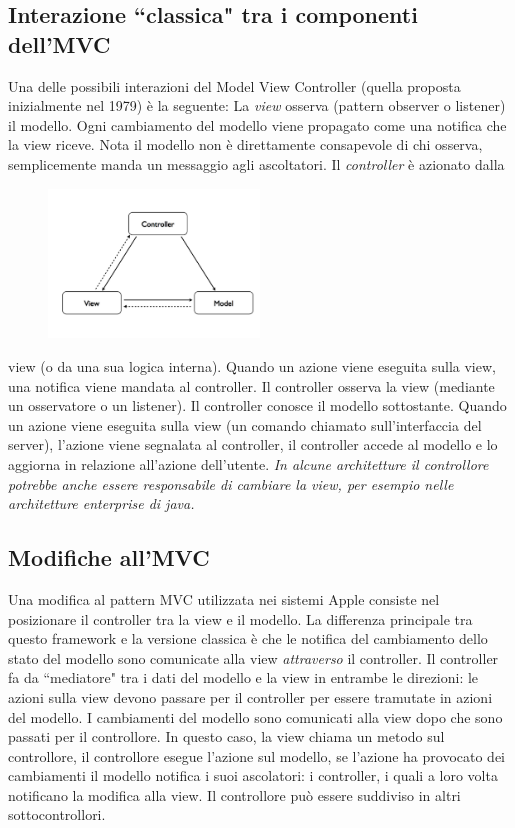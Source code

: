 \documentclass{article}
\begin{document}
\subsection{Interazione ``classica" tra i componenti dell'MVC}
Una delle possibili interazioni del Model View Controller (quella proposta inizialmente nel 1979) \`e la seguente:
 La \emph{view} osserva (pattern observer o listener) il modello. Ogni cambiamento del modello viene propagato come una notifica che la view riceve. Nota il modello non \`e direttamente consapevole di chi osserva, semplicemente manda un messaggio agli ascoltatori.
Il \emph{controller} \`e azionato dalla\begin{figure}[h]
\centering
\includegraphics[width=0.5\textwidth]{Img/MVC2.pdf}
\end{figure} view (o da una sua logica interna). Quando un azione viene eseguita sulla view, una notifica viene mandata al controller. Il controller osserva la view (mediante un osservatore o un listener). Il controller conosce il modello sottostante. Quando un azione viene eseguita sulla view (un comando chiamato sull'interfaccia del server), l'azione viene segnalata al controller, il controller accede al modello e lo aggiorna in relazione all'azione dell'utente. \emph{In alcune architetture il controllore potrebbe anche essere responsabile di cambiare la view, per esempio nelle architetture enterprise di java.}




\subsection{Modifiche all'MVC}
\label{ModificheMVC}
Una modifica al pattern MVC utilizzata nei sistemi Apple consiste nel posizionare il controller tra la view e il modello. La differenza principale tra questo framework e la versione classica \`e che le notifica del cambiamento dello stato del modello sono comunicate alla view \emph{attraverso} il controller. Il controller fa da ``mediatore" tra i dati del modello e la view in entrambe le direzioni: le azioni sulla view devono passare per il controller per essere tramutate in azioni del modello. I cambiamenti del modello sono comunicati alla view dopo che sono passati per il controllore. 
In questo caso, la view chiama un metodo sul controllore, il controllore esegue l'azione sul modello, se l'azione ha provocato dei cambiamenti il modello notifica i suoi ascolatori: i controller, i quali a loro volta notificano la modifica alla view. Il controllore pu\`o essere suddiviso in altri sottocontrollori.
\end{document}
